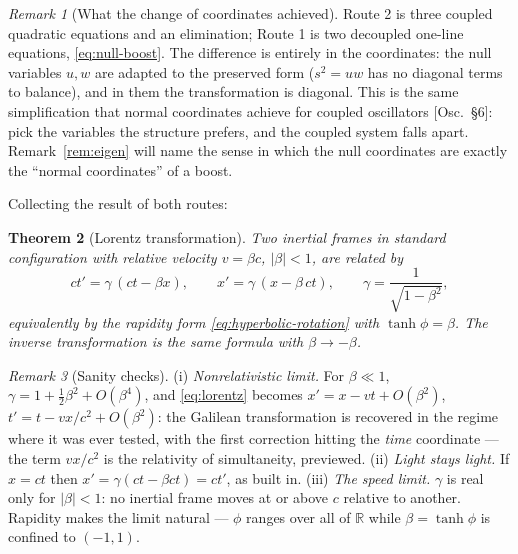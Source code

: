 \documentclass[11pt]{article}
\theoremstyle{plain}
\newtheorem{theorem}{Theorem}[section]
\theoremstyle{definition}
\theoremstyle{remark}
\newtheorem{remark}[theorem]{Remark}
\newcommand{\R}{\mathbb{R}}
\begin{document}
\begin{remark}[What the change of coordinates achieved]
\label{rem:two-routes}
Route 2 is three coupled quadratic equations and an elimination; Route 1
is two decoupled one-line equations, \eqref{eq:null-boost}. The
difference is entirely in the coordinates: the null variables $u, w$ are
adapted to the preserved form ($s^2 = uw$ has no diagonal terms to
balance), and in them the transformation is diagonal. This is the same
simplification that normal coordinates achieve for coupled oscillators [Osc.\
\S6]: pick the variables the structure prefers, and the coupled system
falls apart. Remark~\ref{rem:eigen} will name the sense in which the
null coordinates are exactly the ``normal coordinates'' of a boost.
\end{remark}

\noindent
Collecting the result of both routes:

\begin{theorem}[Lorentz transformation]\label{thm:lorentz}
Two inertial frames in standard configuration with relative velocity
$v = \beta c$, $|\beta| < 1$, are related by
\begin{equation}
  \boxed{\;
  ct' = \gamma\,(ct - \beta x),
  \qquad
  x' = \gamma\,(x - \beta\, ct),
  \qquad
  \gamma = \frac{1}{\sqrt{1-\beta^2}},
  \;}
  \label{eq:lorentz}
\end{equation}
equivalently by the rapidity form \eqref{eq:hyperbolic-rotation} with
$\tanh\phi = \beta$. The inverse transformation is the same formula with
$\beta \to -\beta$.
\end{theorem}

\begin{remark}[Sanity checks]\label{rem:sanity}
(i) \emph{Nonrelativistic limit.} For $\beta \ll 1$,
$\gamma = 1 + \tfrac12\beta^2 + O(\beta^4)$, and \eqref{eq:lorentz}
becomes $x' = x - vt + O(\beta^2)$, $t' = t - vx/c^2 + O(\beta^2)$: the
Galilean transformation is recovered in the regime where it was ever
tested, with the first correction hitting the \emph{time} coordinate ---
the term $vx/c^2$ is the relativity of simultaneity, previewed.
(ii) \emph{Light stays light.} If $x = ct$ then
$x' = \gamma(ct - \beta ct) = ct'$, as built in.
(iii) \emph{The speed limit.} $\gamma$ is real only for $|\beta| < 1$:
no inertial frame moves at or above $c$ relative to another. Rapidity
makes the limit natural --- $\phi$ ranges over all of $\R$ while
$\beta = \tanh\phi$ is confined to $(-1, 1)$.
\end{remark}
\end{document}
